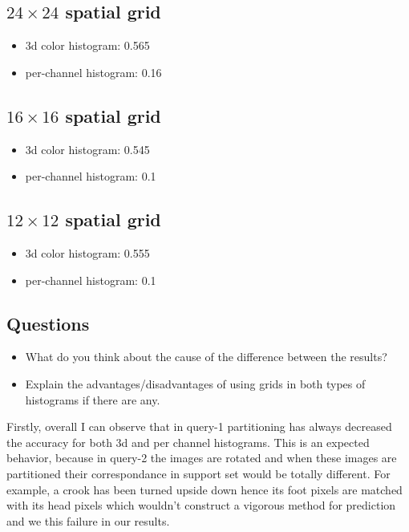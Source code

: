 \documentclass[12pt]{article}
\begin{document}
\subsection{$24\times24$ spatial grid}
\begin{itemize}
\item 3d color histogram: 0.565
\item per-channel histogram: 0.16
\end{itemize}

\subsection{$16\times16$ spatial grid}
\begin{itemize}
\item 3d color histogram: 0.545
\item per-channel histogram: 0.1
\end{itemize}

\subsection{$12\times12$ spatial grid}
\begin{itemize}
\item 3d color histogram: 0.555
\item per-channel histogram: 0.1
\end{itemize}

\subsection{Questions}
\begin{itemize}
\item What do you think about the cause of the difference between the results?
\item Explain the advantages/disadvantages of using grids in both types of histograms if there are any.
\end{itemize}

Firstly, overall I can observe that in query-1 partitioning has always decreased the accuracy 
for both 3d and per channel histograms. This is an expected behavior, because in query-2
the images are rotated and when these images are partitioned their correspondance
in support set would be totally different. For example, a crook has been turned upside down
hence its foot pixels are matched with its head pixels which wouldn't construct a vigorous
method for prediction and we this failure in our results.
\end{document}
